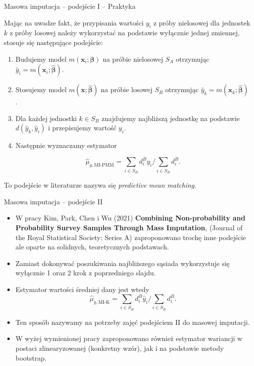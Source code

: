 \documentclass[10pt,ignorenonframetext, aspectratio=169]{beamer}
\newcommand{\bx}{\boldsymbol{x}}
\newcommand{\bbeta}{\boldsymbol{\beta}}
\begin{document}
\begin{frame}{Masowa imputacja -- podejście I -- Praktyka}

Mając na uwadze fakt, że przypisania wartości $y_i$ z próby nielosowej dla jednostek $k$ z próby losowej należy wykorzystać na podstawie wyłącznie jednej zmiennej, stosuje się następujące podejście:

\begin{enumerate}
    \item Budujemy model $m(\bx_i; \bbeta)$ na próbie nielosowej $S_A$ otrzymując $\hat{y}_i = m(\bx_i; \hat{\bbeta})$.
    \item Stosujemy model $m(\bx; \hat{\bbeta})$ na próbie losowej $S_B$ otrzymując $\hat{y}_k = m(\bx_k; \hat{\bbeta})$.
    \item Dla każdej jednostki $k \in S_B$ znajdujemy najbliższą jednostkę na podstawie $d(\hat{y}_k, \hat{y}_{i})$ i przepisujemy wartość $y_i$.
    \item Następnie wyznaczamy estymator

        \begin{equation}
        \hat{\mu}_{y,\text{MI-PMM}} = \sum_{i \in S_B} d_i^B y_i / \sum_{i \in S_B} d_i^B.
    \end{equation}

\end{enumerate}
To podejście w literaturze nazywa się \textit{predictive mean matching}.
\end{frame}

\begin{frame}{Masowa imputacja -- podejście II}

\begin{itemize}
    \item W pracy Kim,  Park, Chen i Wu (2021) \textbf{Combining Non-probability and Probability Survey Samples Through Mass Imputation}, (Journal of the Royal Statistical Society: Series A) zaproponowano trochę inne podejście ale oparte na solidnych, teoretycznych podstawach.
    \item Zamiast dokonywać poszukiwania najbliższego sąsiada wykorzystuje się wyłącznie 1 oraz 2 krok z poprzedniego slajdu.
    \item Estymator wartości średniej dany jest wtedy
         \begin{equation}
        \hat{\mu}_{y,\text{MI-K}} = \sum_{i \in S_B} d_i^B\hat{y}_i / \sum_{i \in S_B} d_i^B.
    \end{equation}
    \item Ten sposób nazywamy na potrzeby zajęć podejściem II do masowej imputacji.
    \item W wyżej wymienionej pracy zaproponowano również estymator wariancji w postaci zlinearyzowanej (konkretny wzór), jak i na podstawie metody bootstrap.
\end{itemize}
\end{frame}
\end{document}
